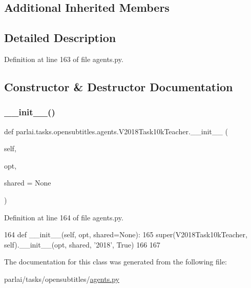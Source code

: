 \subsection*{Additional Inherited Members}


\subsection{Detailed Description}


Definition at line 163 of file agents.\+py.



\subsection{Constructor \& Destructor Documentation}
\mbox{\label{classparlai_1_1tasks_1_1opensubtitles_1_1agents_1_1V2018Task10kTeacher_af6e78685bc810f960b3d35b1dd1bf281}} 
\subsubsection{\texorpdfstring{\+\_\+\+\_\+init\+\_\+\+\_\+()}{\_\_init\_\_()}}
{\footnotesize\ttfamily def parlai.\+tasks.\+opensubtitles.\+agents.\+V2018\+Task10k\+Teacher.\+\_\+\+\_\+init\+\_\+\+\_\+ (\begin{DoxyParamCaption}\item[{}]{self,  }\item[{}]{opt,  }\item[{}]{shared = {\ttfamily None} }\end{DoxyParamCaption})}



Definition at line 164 of file agents.\+py.


\begin{DoxyCode}
164     \textcolor{keyword}{def }\_\_init\_\_(self, opt, shared=None):
165         super(V2018Task10kTeacher, self).\_\_init\_\_(opt, shared, \textcolor{stringliteral}{'2018'}, \textcolor{keyword}{True})
166 
167 
\end{DoxyCode}


The documentation for this class was generated from the following file\+:\begin{DoxyCompactItemize}
\item 
parlai/tasks/opensubtitles/\hyperlink{parlai_2tasks_2opensubtitles_2agents_8py}{agents.\+py}\end{DoxyCompactItemize}
